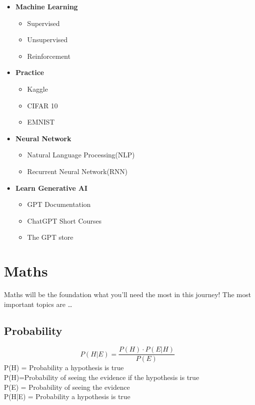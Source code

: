 \documentclass{book}
\begin{document}
\begin{itemize}
	\item \textbf{Machine Learning}
	      \begin{itemize}
		      \item Supervised
		      \item Unsupervised
		      \item Reinforcement
	      \end{itemize}
	\item \textbf{Practice}
	      \begin{itemize}
		      \item Kaggle
		      \item CIFAR 10
		      \item EMNIST
	      \end{itemize}
	\item \textbf{Neural Network}
	      \begin{itemize}
		      \item Natural Language Processing(NLP)
		      \item Recurrent Neural Network(RNN)
	      \end{itemize}
	\item \textbf{Learn Generative AI}
	      \begin{itemize}
		      \item GPT Documentation
		      \item ChatGPT Short Courses
		      \item The GPT store
	      \end{itemize}
\end{itemize}
\newpage
\chapter{Maths}

Maths will be the foundation what you'll need the most in this journey!
The most important topics are \dots

\section{Probability}

\begin{equation}
	P(H|E) = \frac{P(H) \cdot P(E|H)}{P(E)}
	\label{Bayes' Theorem}
\end{equation}
P(H) = Probability  a  hypothesis  is  true\\
P(H)=Probability  of   seeing  the  evidence  if   the  hypothesis  is  true\\
P(E) = Probability   of   seeing   the   evidence\\
P(H|E) = Probability   a  hypothesis   is   true \\
\end{document}
